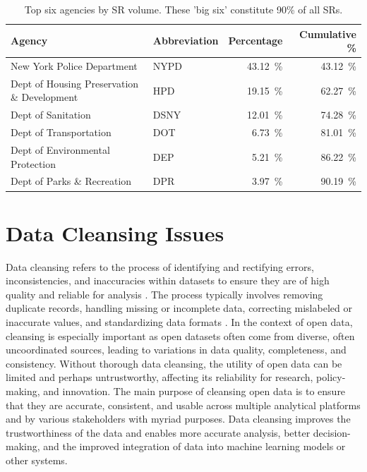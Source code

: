 \documentclass[linenumber]{jdsart}
\begin{document}
\begin{table}[htbp]
\centering
\caption{Top six agencies by SR volume. These 'big six' constitute 90\% of all SRs.}
\label{tab:top-agencies}
\begin{tabular}{llrr}
\toprule
Agency & Abbreviation & Percentage & Cumulative \% \\
\midrule
New York Police Department & NYPD & \SI{43.12}{\percent} & \SI{43.12}{\percent} \\
Dept of Housing Preservation \& Development & HPD & \SI{19.15}{\percent} & \SI{62.27}{\percent} \\
Dept of Sanitation & DSNY & \SI{12.01}{\percent} & \SI{74.28}{\percent} \\
Dept of Transportation & DOT & \SI{6.73}{\percent} & \SI{81.01}{\percent} \\
Dept of Environmental Protection & DEP & \SI{5.21}{\percent} & \SI{86.22}{\percent} \\
Dept of Parks \& Recreation & DPR & \SI{3.97}{\percent} & \SI{90.19}{\percent} \\
\bottomrule
\end{tabular}
\end{table}






\section{Data Cleansing Issues} 
\label{sec:issues}
Data cleansing refers to the process of identifying and rectifying
errors, inconsistencies, and inaccuracies within datasets to ensure
they are of high quality and reliable for analysis
\citep{maletic2005data, hosseinzadeh2023data}. The process
typically involves removing duplicate records, handling missing or
incomplete data, correcting mislabeled or inaccurate values, and
standardizing data formats \citep[e.g.,][]{cody2017cody, van2018statistical}. In 
the context of open data, cleansing is especially important 
as open datasets often come from diverse,
often uncoordinated sources, leading to variations in data quality,
completeness, and consistency. Without thorough data cleansing, 
the utility of open data can be limited and perhaps 
untrustworthy, affecting its reliability for research, 
policy-making, and innovation. The main purpose of cleansing 
open data is to ensure that they are accurate, consistent, and usable 
across multiple analytical platforms and by various stakeholders with
myriad purposes. Data cleansing improves the trustworthiness 
of the data and enables more accurate analysis, 
better decision-making, and the improved integration of 
data into machine learning models or other systems.
\end{document}
